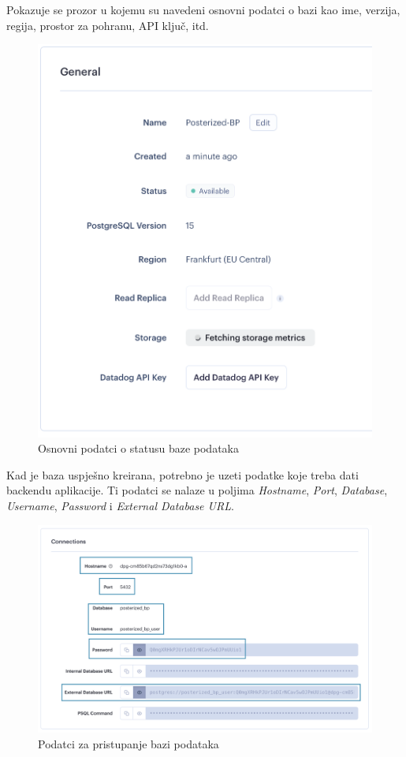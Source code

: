 			Pokazuje se prozor u kojemu su navedeni osnovni podatci o bazi kao ime, verzija, regija, prostor za pohranu, API ključ, itd.
			\begin{figure}[H]
				\includegraphics[scale=0.3]{slike/deploy/database3.png} %
				\centering
				\caption{Osnovni podatci o statusu baze podataka}
				\label{fig:promjene}
			\end{figure}
			
			Kad je baza uspješno kreirana, potrebno je uzeti podatke koje treba dati backendu aplikacije. Ti podatci se nalaze u poljima \textit{Hostname}, \textit{Port}, \textit{Database}, \textit{Username}, \textit{Password} i \textit{External Database URL}.
			\begin{figure}[H]
				\includegraphics[scale=0.4]{slike/deploy/database4.png} %
				\centering
				\caption{Podatci za pristupanje bazi podataka}
				\label{fig:promjene}
			\end{figure}
			

